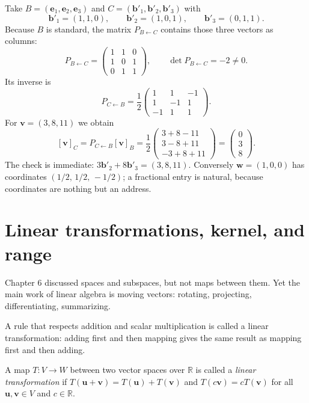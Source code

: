 Take $B=(\mathbf{e}_{1},\mathbf{e}_{2},\mathbf{e}_{3})$
and $C=(\mathbf{b}'_{1},\mathbf{b}'_{2},\mathbf{b}'_{3})$ with
\[
  \mathbf{b}'_{1}=(1,1,0),\qquad \mathbf{b}'_{2}=(1,0,1),\qquad \mathbf{b}'_{3}=(0,1,1).
\]
Because $B$ is standard, the matrix $P_{B\leftarrow C}$ contains those three vectors as columns:
\[
  P_{B\leftarrow C}=\begin{pmatrix}1&1&0\\ 1&0&1\\ 0&1&1\end{pmatrix},
  \qquad \det P_{B\leftarrow C}=-2\neq0 .
\]
Its inverse is
\[
  P_{C\leftarrow B}=\frac{1}{2}\begin{pmatrix}1&1&-1\\ 1&-1&1\\ -1&1&1\end{pmatrix}.
\]
For $\mathbf{v}=(3,8,11)$ we obtain
\[
  [\mathbf{v}]_{C}=P_{C\leftarrow B}[\mathbf{v}]_{B}
  =\frac{1}{2}\begin{pmatrix}3+8-11\\ 3-8+11\\ -3+8+11\end{pmatrix}
  =\begin{pmatrix}0\\ 3\\ 8\end{pmatrix}.
\]
The check is immediate: $3\mathbf{b}'_{2}+8\mathbf{b}'_{3}=(3,8,11)$. Conversely
$\mathbf{w}=(1,0,0)$ has coordinates $(1/2,\,1/2,\,-1/2)$; a fractional entry is natural,
because
coordinates are nothing but an address.

\section{Linear transformations, kernel, and range}

Chapter 6 discussed spaces and subspaces, but not maps between them. Yet the main work of
linear algebra is moving vectors: rotating, projecting, differentiating, summarizing.

A rule that respects addition and scalar multiplication is called a linear transformation:
adding first and then mapping gives the same result as mapping first and then adding.

\begin{definisi}
A map $T\colon V\to W$ between two vector spaces over $\mathbb{R}$ is called a
\emph{linear transformation} if $T(\mathbf{u}+\mathbf{v})=T(\mathbf{u})+T(\mathbf{v})$ and
$T(c\mathbf{v})=cT(\mathbf{v})$ for all $\mathbf{u},\mathbf{v}\in V$ and $c\in\mathbb{R}$.
\end{definisi}

